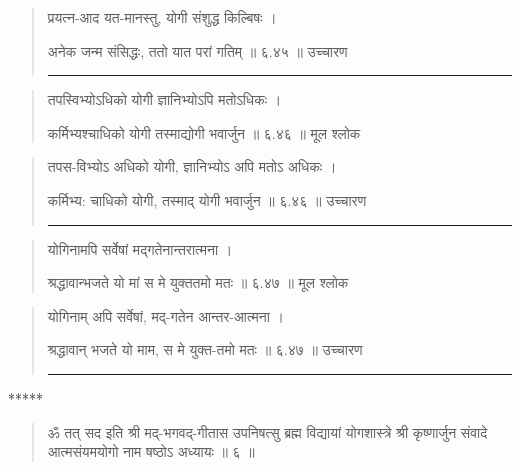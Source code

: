 \begin{quotation}
प्रयत्न-आद यत-मानस्तु, योगी संशुद्ध किल्बिषः  ।  

अनेक जन्म संसिद्धः, ततो यात परां गतिम्‌  ॥ ६.४५ ॥  उच्चारण

\noindent\rule{16cm}{0.4pt} 
\end{quotation}


\begin{quotation}  

तपस्विभ्योऽधिको योगी ज्ञानिभ्योऽपि मतोऽधिकः  ।  

कर्मिभ्यश्चाधिको योगी तस्माद्योगी भवार्जुन  ॥ ६.४६ ॥  मूल श्लोक
\end{quotation}

\begin{quotation}

तपस-विभ्योऽ अधिको योगी, ज्ञानिभ्योऽ अपि मतोऽ अधिकः  ।  

कर्मिभ्य: चाधिको योगी, तस्माद् योगी भवार्जुन  ॥ ६.४६ ॥  उच्चारण

\noindent\rule{16cm}{0.4pt} 
\end{quotation}


\begin{quotation}  

योगिनामपि सर्वेषां मद्गतेनान्तरात्मना  ।  

श्रद्धावान्भजते यो मां स मे युक्ततमो मतः  ॥ ६.४७ ॥  मूल श्लोक
\end{quotation}

\begin{quotation}

योगिनाम् अपि सर्वेषां, मद्-गतेन आन्तर-आत्मना  ।  

श्रद्धावान् भजते यो माम, स मे युक्त-तमो मतः  ॥ ६.४७ ॥  उच्चारण

\noindent\rule{16cm}{0.4pt} 
\end{quotation}

\begin{center} ***** \end{center}


\begin{quotation}  


ॐ तत् सद इति श्री मद्-भगवद्-गीतास उपनिषत्सु ब्रह्म विद्यायां योगशास्त्रे श्री कृष्णार्जुन संवादे आत्मसंयमयोगो नाम षष्ठोऽ अध्यायः  ॥  ६  ॥ 

\end{quotation}